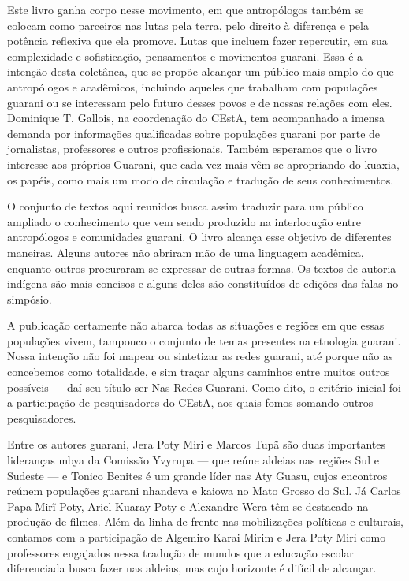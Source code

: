 Este livro ganha corpo nesse movimento, em que antropólogos também se
colocam como parceiros nas lutas pela terra, pelo direito à diferença e
pela potência reflexiva que ela promove. Lutas que incluem fazer
repercutir, em sua complexidade e sofisticação, pensamentos e
movimentos guarani. Essa é a intenção desta coletânea, que se propõe
alcançar um público mais amplo do que antropólogos e acadêmicos,
incluindo aqueles que trabalham com populações guarani ou se interessam
pelo futuro desses povos e de nossas relações com eles. Dominique T.
Gallois, na coordenação do CEstA, tem acompanhado a imensa demanda por
informações qualificadas sobre populações guarani por
parte de jornalistas, professores e outros profissionais. Também esperamos que
o livro interesse aos próprios Guarani, que cada vez mais vêm se
apropriando do kuaxia, os papéis, como mais um modo de circulação e
tradução de seus conhecimentos.

O conjunto de textos aqui reunidos busca assim traduzir para um público
ampliado o conhecimento que vem sendo produzido na interlocução entre
antropólogos e comunidades guarani. O livro alcança esse objetivo de
diferentes maneiras. Alguns autores não abriram mão de uma linguagem
acadêmica, enquanto outros procuraram se expressar de outras formas. Os
textos de autoria indígena são mais concisos e alguns deles são constituídos de
edições das falas no simpósio. 

A publicação certamente não abarca todas as situações e regiões em que
essas populações vivem, tampouco o conjunto de temas presentes na
etnologia guarani. Nossa intenção não foi mapear ou sintetizar as redes
guarani, até porque não as concebemos como totalidade, e sim traçar
alguns caminhos entre muitos outros possíveis — daí seu título ser Nas
Redes Guarani. Como dito, o critério inicial foi a participação de
pesquisadores do CEstA, aos quais fomos somando outros pesquisadores. 

Entre os autores guarani, Jera Poty Miri e Marcos Tupã são duas
importantes lideranças mbya da Comissão Yvyrupa — que reúne aldeias nas
regiões Sul e Sudeste — e Tonico Benites é um grande líder nas Aty
Guasu, cujos encontros reúnem populações guarani nhandeva e kaiowa no
Mato Grosso do Sul. Já Carlos Papa Mirĩ Poty, Ariel Kuaray Poty e
Alexandre Wera têm se destacado na produção de filmes. Além da linha de
frente nas mobilizações políticas e culturais, contamos com a
participação de Algemiro Karai Mirim e Jera Poty Miri como professores
engajados nessa tradução de mundos que a educação escolar diferenciada
busca fazer nas aldeias, mas cujo horizonte é difícil de alcançar.

